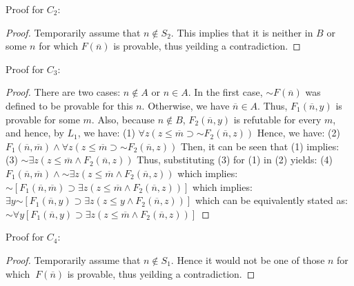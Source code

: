 \documentclass{article}
\newcommand*{\oldneg}{\mathord{\sim}}
\theoremstyle{definition}
\begin{document}
Proof for $C_2$:
\begin{proof}
Temporarily assume that $n\notin S_2$. This implies that it is neither in $B$ or some $n$ for which $F(\overline n)$ is provable, thus yeilding a
contradiction.
\end{proof}
Proof for $C_3$:
\begin{proof}
There are two cases: $n\notin A$ or $n\in A$. In the first case, $\oldneg F(\overline n)$ was defined to be provable for this $n$. Otherwise, we have
$\overline n\in A$. Thus, $F_1(\overline n, y)$ is provable for some $m$. Also, because $n \notin B$, $F_2(\overline n, y)$ is refutable for every $m$,
and hence, by $L_1$, we have:\newline
(1) $\forall z(z \le \overline m \supset \oldneg F_2(\overline n, z))$\newline
Hence, we have:\newline
(2) $F_1(\overline n, \overline m) \wedge \forall z(z\le \overline m \supset \oldneg F_2(\overline n, z))$\newline
Then, it can be seen that (1) implies:\newline
(3) $\oldneg \exists z(z \le \overline m \wedge F_2(\overline n, z))$ \newline 
Thus, substituting (3) for (1) in (2) yields:\newline
(4) $F_1(\overline n, \overline m) \wedge \oldneg \exists z(z \le \overline m \wedge F_2(\overline n, z))$\newline
which implies:\newline
$\oldneg [F_1(\overline n, \overline m) \supset \exists z(z \le \overline m \wedge F_2(\overline n, z))]$\newline
which implies:\newline
$\exists y\oldneg[F_1(\overline n, y) \supset \exists z(z \le y \wedge F_2(\overline n, z))]$\newline
which can be equivalently stated as:
$\oldneg \forall y[F_1(\overline n, y) \supset \exists z(z \le \overline m \wedge F_2(\overline n, z))]$\newline
\end{proof}
Proof for $C_4$:
\begin{proof}
Temporarily assume that $n\notin S_1$. Hence it would not be one of those $n$ for which $~F(\overline n)$ is provable, thus yeilding a contradiction.
\end{proof} 
\end{document}
